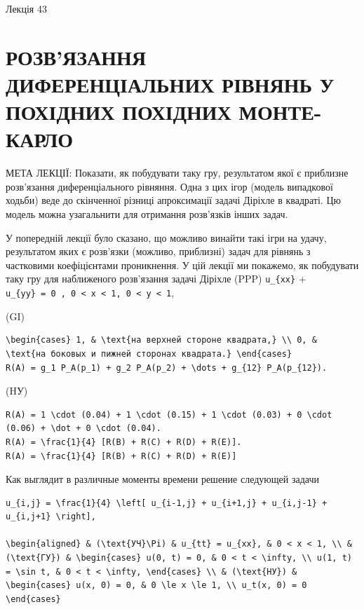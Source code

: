\documentclass[
  ukrainian,
]{article}
\begin{document}
Лекція 43

\section{РОЗВ'ЯЗАННЯ ДИФЕРЕНЦІАЛЬНИХ РІВНЯНЬ У ПОХІДНИХ ПОХІДНИХ
МОНТЕ-КАРЛО}\label{ux440ux43eux437ux432ux44fux437ux430ux43dux43dux44f-ux434ux438ux444ux435ux440ux435ux43dux446ux456ux430ux43bux44cux43dux438ux445-ux440ux456ux432ux43dux44fux43dux44c-ux443-ux43fux43eux445ux456ux434ux43dux438ux445-ux43fux43eux445ux456ux434ux43dux438ux445-ux43cux43eux43dux442ux435-ux43aux430ux440ux43bux43e}

МЕТА ЛЕКЦІЇ: Показати, як побудувати таку гру, результатом якої є
приблизне розв'язання диференціального рівняння. Одна з цих ігор (модель
випадкової ходьби) веде до скінченної різниці апроксимації задачі
Діріхле в квадраті. Цю модель можна узагальнити для отримання розв'язків
інших задач.

У попередній лекції було сказано, що можливо винайти такі ігри на удачу,
результатом яких є розв'язки (можливо, приблизні) задач для рівнянь з
частковими коефіцієнтами проникнення. У цій лекції ми покажемо, як
побудувати таку гру для наближеного розв'язання задачі Діріхле (PPP)
\texttt{u\_\{xx\}} +
\texttt{u\_\{yy\}\ =\ 0\ ,\ 0\ \textless{}\ x\ \textless{}\ 1,\ 0\ \textless{}\ y\ \textless{}\ 1},

(GI)

\begin{verbatim}
\begin{cases} 1, & \text{на верхней стороне квадрата,} \\ 0, & \text{на боковых и пижней сторонах квадрата.} \end{cases}
R(A) = g_1 P_A(p_1) + g_2 P_A(p_2) + \dots + g_{12} P_A(p_{12}).
\end{verbatim}

(HУ)

\begin{verbatim}
R(A) = 1 \cdot (0.04) + 1 \cdot (0.15) + 1 \cdot (0.03) + 0 \cdot (0.06) + \dot + 0 \cdot (0.04).
R(A) = \frac{1}{4} [R(B) + R(C) + R(D) + R(E)].
R(A) = \frac{1}{4} [R(B) + R(C) + R(D) + R(E)]
\end{verbatim}

Как выглядит в различные моменты времени решение следующей задачи

\begin{verbatim}
u_{i,j} = \frac{1}{4} \left[ u_{i-1,j} + u_{i+1,j} + u_{i,j-1} + u_{i,j+1} \right],

\begin{aligned} & (\text{УЧ}\Pi) & u_{tt} = u_{xx}, & 0 < x < 1, \\ & (\text{ГУ}) & \begin{cases} u(0, t) = 0, & 0 < t < \infty, \\ u(1, t) = \sin t, & 0 < t < \infty, \end{cases} \\ & (\text{НУ}) & \begin{cases} u(x, 0) = 0, & 0 \le x \le 1, \\ u_t(x, 0) = 0 \end{cases}
\end{verbatim}
\end{document}
